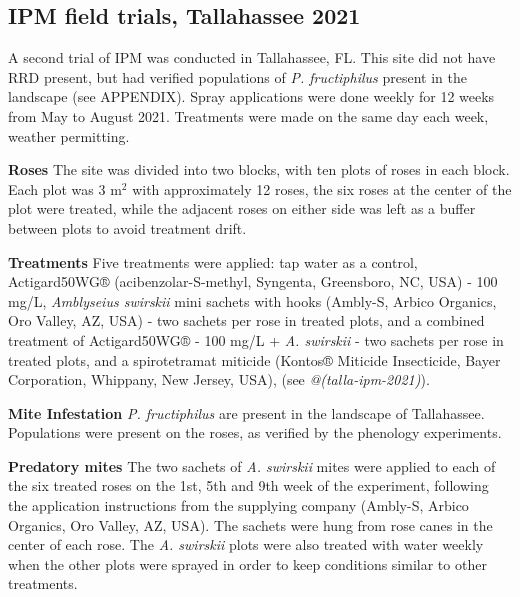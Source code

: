 \documentclass{ufdissertation}[overrideChapters] %
\begin{document}
{\hypertarget{ipm-field-trials-tallahassee-2021}{%
\subsection{IPM field trials, Tallahassee 2021}\label{ipm-field-trials-tallahassee-2021}}

A second trial of IPM was conducted in Tallahassee, FL. This site did not have RRD present, but had verified populations of \emph{P. fructiphilus} present in the landscape (see APPENDIX). Spray applications were done weekly for 12 weeks from May to August 2021. Treatments were made on the same day each week, weather permitting.

\textbf{Roses}
The site was divided into two blocks, with ten plots of roses in each block. Each plot was 3 \si{m}\(^2\) with approximately 12 roses, the six roses at the center of the plot were treated, while the adjacent roses on either side was left as a buffer between plots to avoid treatment drift.

\textbf{Treatments}
Five treatments were applied: tap water as a control, Actigard50WG® (acibenzolar-S-methyl, Syngenta, Greensboro, NC, USA) - 100 \si{\milli\gram}/\si{\liter}, \emph{Amblyseius swirskii} mini sachets with hooks (Ambly-S, Arbico Organics, Oro Valley, AZ, USA) - two sachets per rose in treated plots, and a combined treatment of Actigard50WG® - 100 \si{\milli\gram}/\si{\liter} + \emph{A. swirskii} - two sachets per rose in treated plots, and a spirotetramat miticide (Kontos® Miticide Insecticide, Bayer Corporation, Whippany, New Jersey, USA), (see \emph{@(talla-ipm-2021)}).

\textbf{Mite Infestation}
\emph{P. fructiphilus} are present in the landscape of Tallahassee. Populations were present on the roses, as verified by the phenology experiments.

\textbf{Predatory mites}
The two sachets of \emph{A. swirskii} mites were applied to each of the six treated roses on the 1st, 5th and 9th week of the experiment, following the application instructions from the supplying company (Ambly-S, Arbico Organics, Oro Valley, AZ, USA). The sachets were hung from rose canes in the center of each rose. The \emph{A. swirskii} plots were also treated with water weekly when the other plots were sprayed in order to keep conditions similar to other treatments.

}
\end{document}

